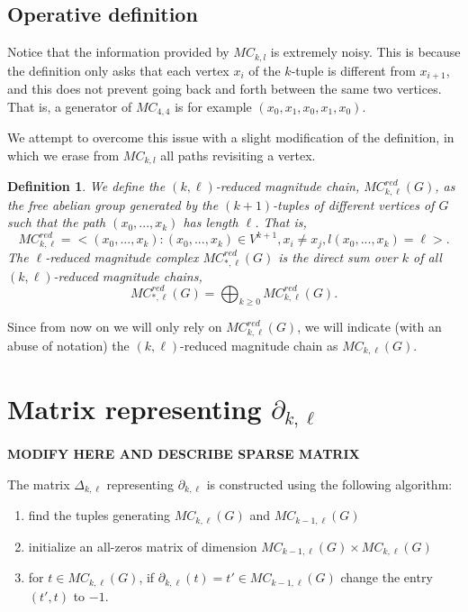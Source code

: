 \documentclass{article}
\newtheorem{definition}[theorem]{Definition}
\newcommand{\boundary}{\partial_{k,\ell}}
\begin{document}
	\subsection{Operative definition}
	Notice that the information provided by $MC_{k,l}$ is extremely noisy. This is because the definition only asks that each vertex $x_i$ of the $k$-tuple is different from $x_{i+1}$, and this does not prevent going back and forth between the same two vertices. That is, a generator of $MC_{4,4}$ is for example $(x_0,x_1,x_0,x_1,x_0)$.
	
	We attempt to overcome this issue with a slight modification of the definition, in which we erase from $MC_{k,l}$ all paths revisiting a vertex.
	
	\begin{definition}
		We define the \emph{$(k,\ell)$-reduced magnitude chain}, $MC_{k,\ell}^{red}(G)$, as the free abelian group generated by the $(k+1)$-tuples of \emph{different} vertices of $G$ such that the path $(x_0,...,x_k)$ has length $\ell$. That is,
		$$
		MC_{k,\ell}^{red}=<(x_0,...,x_k): (x_0,...,x_k)\in V^{k+1}, x_i \neq x_j, l(x_0,...,x_k)=\ell>.
		$$
		The \emph{$\ell$-reduced magnitude complex} $MC_{*,\ell}^{red}(G)$ is the direct sum over $k$ of all $(k,\ell)$-reduced magnitude chains,
		$$
		MC_{*,\ell}^{red}(G) = \bigoplus_{k\geq 0} MC_{k,\ell}^{red}(G).
		$$
	\end{definition}
	
	Since from now on we will only rely on $MC_{k,\ell}^{red}(G)$, we will indicate (with an abuse of notation) the $(k,\ell)$-reduced magnitude chain as $MC_{k,\ell}(G)$.
	
	\section{Matrix representing $\boundary$}
	\textbf{MODIFY HERE AND DESCRIBE SPARSE MATRIX}
	
	The matrix $\Delta_{k,\ell}$ representing $\boundary$ is constructed using the following algorithm:
	\begin{enumerate}
		\item find the tuples generating $MC_{k,\ell}(G)$ and $MC_{k-1,\ell}(G)$
		\item initialize an all-zeros matrix of dimension $MC_{k-1,\ell}(G) \times MC_{k,\ell}(G)$
		\item for $t \in MC_{k,\ell}(G)$, if $\boundary(t)=t' \in MC_{k-1,\ell}(G)$ change the entry $(t',t)$ to $-1$.
	\end{enumerate}
	
\end{document}
